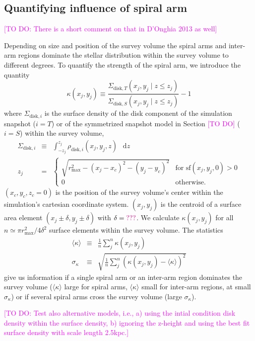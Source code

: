 \documentclass[iop,revtex4,numberedappendix,appendixfloats]{emulateapj}
\newcommand*\diff{\mathop{}\!\mathrm{d}}
\newcommand{\Wilma}[1]{\textcolor{Magenta}{#1}}
\begin{document}
\subsection{Quantifying influence of spiral arm}

\Wilma{[TO DO: There is a short comment on that in D'Onghia 2013 as well]}

Depending on size and position of the survey volume the spiral arms and inter-arm regions dominate the stellar distribution within the survey volume to different degrees. To quantify the strength of the spiral arm, we introduce the quantity
\begin{equation*}
\kappa(x_j,y_j) \equiv \frac{\Sigma_{\text{disk},T}(x_j,y_j \mid z\leq z_j)}{\Sigma_{\text{disk},S}(x_j,y_j \mid z\leq z_j)} -1
\end{equation*}
where $\Sigma_{\text{disk},i}$ is the surface density of the disk component  of the simulation snapshot ($i=T$) or of the symmetrized snapshot model in Section \Wilma{[TO DO]} ($i=S$) within the survey volume,
\begin{eqnarray*}
\Sigma_{\text{disk},i} &\equiv& \int_{-z_j}^{z_j} \rho_{\text{disk},i}(x_j,y_j,z) \ \diff z\\
z_j &=& \begin{cases}
\sqrt{r_\text{max}^2 - (x_j-x_c)^2 - (y_j-y_c)^2} & \text{for sf}(x_j,y_j,0) > 0\\
0 & \text{otherwise.}
\end{cases}
\end{eqnarray*}
$(x_c,y_c,z_c=0)$ is the position of the survey volume's center within the simulation's cartesian coordinate system. $(x_j,y_j)$ is the centroid of a surface area element $(x_j\pm\delta,y_j\pm \delta)$ with $\delta=\Wilma{???}$. We calculate $\kappa(x_j,y_j)$ for all $n \simeq \pi r_\text{max}^2/4\delta^2$ surface elements within the survey volume. The statistics
\begin{eqnarray*}
\langle \kappa \rangle &\equiv& \frac 1n \sum_j^n \kappa(x_j,y_j)\\
\sigma_\kappa &\equiv& \sqrt{\frac 1n \sum_j^n \left(\kappa(x_j,y_j) - \langle \kappa \rangle \right)^2}
\end{eqnarray*}
give us information if a single spiral arm or an inter-arm region dominates the survey volume ($\langle \kappa \rangle$ large for spiral arms, $\langle \kappa \rangle$ small for inter-arm regions, at small $\sigma_\kappa$) or if several spiral arms cross the survey volume (large $\sigma_\kappa$).

\Wilma{[TO DO: Test also alternative models, i.e., a) using the intial condition disk density within the surface density, b) ignoring the z-height and using the best fit surface density with scale length 2.5kpc.]}
\end{document}
